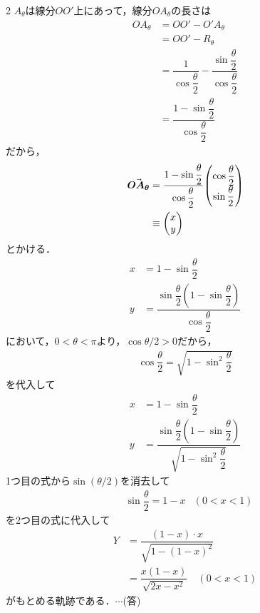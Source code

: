 \documentclass[../../main.tex]{subfiles}
\begin{document}
\begin{multicols}{2}
  $A_{\theta}$は線分$OO'$上にあって，線分$OA_{\theta}$の長さは
  \begin{align}
    OA_{\theta}
    & = OO' - O'A_{\theta}                                                                  \\
    & = OO' - R_{\theta}                                                                    \\
    & = \dfrac{1}{\cos\dfrac{\theta}{2}} -  \dfrac{\sin\dfrac{\theta}{2}}{\cos\dfrac{\theta}{2}} \\
    & = \dfrac{1-\sin\dfrac{\theta}{2}}{\cos\dfrac{\theta}{2}}
  \end{align}
  だから，
  \begin{align}
    \va*{OA_{\theta}}
    & =  \dfrac{1-\sin\dfrac{\theta}{2}}{\cos\dfrac{\theta}{2}} \mqty(\cos\dfrac{\theta}{2} \\ \sin\dfrac{\theta}{2}) \\
    & \equiv \mqty(x                                                                    \\ y)
  \end{align}
  とかける．
  \begin{align}
    x & = 1-\sin\dfrac{\theta}{2}                                                               \\
    y & = \dfrac{\sin\dfrac{\theta}{2}\left(1-\sin\dfrac{\theta}{2}\right)}{\cos\dfrac{\theta}{2}}
  \end{align}
  において，$0<\theta<\pi$より，$\cos\theta/2>0$だから，
  \begin{align}
    \cos\dfrac{\theta}{2} = \sqrt{1-\sin^2\dfrac{\theta}{2}}
  \end{align}
  を代入して
  \begin{align}
    x & = 1-\sin\dfrac{\theta}{2}                                                                          \\
    y & = \dfrac{\sin\dfrac{\theta}{2}\left(1-\sin\dfrac{\theta}{2}\right)}{\sqrt{1-\sin^2\dfrac{\theta}{2}}}
  \end{align}
  1つ目の式から$\sin(\theta/2)$を消去して
  \begin{align}
    & \sin\dfrac{\theta}{2} = 1-x & (0<x<1)
  \end{align}
  を2つ目の式に代入して
  \begin{align}
    Y
    & = \dfrac{(1-x)\cdot x}{\sqrt{1-(1-x)^2}}      \\
    & = \dfrac{x(1-x)}{\sqrt{2x-x^2}} \quad (0<x<1)
  \end{align}
  がもとめる軌跡である．$\cdots$(答)


\end{multicols}
\end{document}
